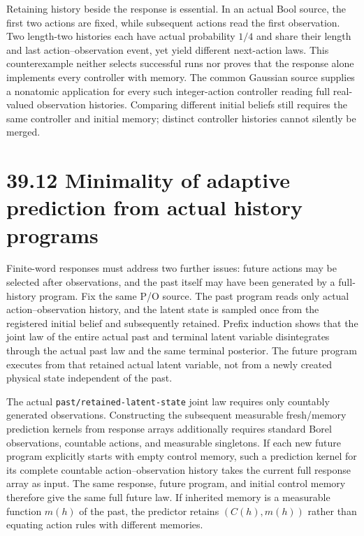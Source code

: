 \documentclass[
  english,
  11pt,
  oneside]{book}
\begin{document}
Retaining history beside the response is essential. In an actual Bool source, the first two actions are fixed, while subsequent actions read the first observation. Two length-two histories each have actual probability \(1/4\) and share their length and last action--observation event, yet yield different next-action laws. This counterexample neither selects successful runs nor proves that the response alone implements every controller with memory. The common Gaussian source supplies a nonatomic application for every such integer-action controller reading full real-valued observation histories. Comparing different initial beliefs still requires the same controller and initial memory; distinct controller histories cannot silently be merged.

\section{39.12 Minimality of adaptive prediction from actual history programs}\label{minimality-of-adaptive-prediction-from-actual-history-programs}

Finite-word responses must address two further issues: future actions may be selected after observations, and the past itself may have been generated by a full-history program. Fix the same P/O source. The past program reads only actual action--observation history, and the latent state is sampled once from the registered initial belief and subsequently retained. Prefix induction shows that the joint law of the entire actual past and terminal latent variable disintegrates through the actual past law and the same terminal posterior. The future program executes from that retained actual latent variable, not from a newly created physical state independent of the past.

The actual \nolinkurl{past/retained-latent-state} joint law requires only countably generated observations. Constructing the subsequent measurable fresh/memory prediction kernels from response arrays additionally requires standard Borel observations, countable actions, and measurable singletons. If each new future program explicitly starts with empty control memory, such a prediction kernel for its complete countable action--observation history takes the current full response array as input. The same response, future program, and initial control memory therefore give the same full future law. If inherited memory is a measurable function \(m(h)\) of the past, the predictor retains \((C(h),m(h))\) rather than equating action rules with different memories.
\end{document}
